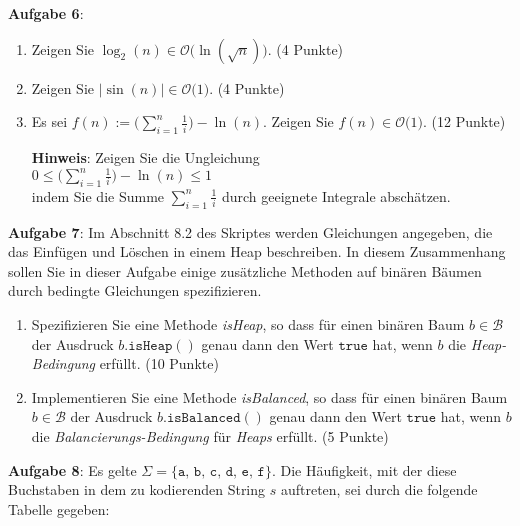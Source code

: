\documentclass{article}
\begin{document}
\noindent
\textbf{Aufgabe 6}:
\begin{enumerate}
\item Zeigen Sie $\log_2(n) \in \mathcal{O}\bigl(\ln(\sqrt{n})\bigr)$. \hspace*{\fill} (4  Punkte)
\item Zeigen Sie $\bigl|\sin(n)\bigr| \in \mathcal{O}\bigl(1\bigr)$. \hspace*{\fill} (4 Punkte)
\item Es sei 
      $f(n) := \biggl(\sum\limits_{i=1}^n \frac{1}{i}\biggr) - \ln(n)$.
      Zeigen Sie $f(n)\in \mathcal{O}\bigl(1\bigr)$. \hspace*{\fill} (12 Punkte)
      
      \textbf{Hinweis}: Zeigen Sie die Ungleichung
      \\[0.2cm]
      \hspace*{1.3cm}
      $0 \leq \biggl(\sum\limits_{i=1}^n \frac{1}{i}\biggr) - \ln(n) \leq 1$
      \\[0.2cm]
      indem Sie die Summe $\sum\limits_{i=1}^n \frac{1}{i}$ durch geeignete Integrale absch\"atzen.
\end{enumerate}
\vspace{0.3cm}


\noindent
\textbf{Aufgabe 7}:  Im Abschnitt 8.2 des Skriptes
werden Gleichungen angegeben, die das Einf\"ugen und L\"oschen in einem Heap beschreiben.
In diesem Zusammenhang sollen Sie in dieser Aufgabe  einige zus\"atzliche Methoden auf
bin\"aren B\"aumen durch bedingte Gleichungen spezifizieren.
\begin{enumerate}
\item Spezifizieren Sie eine Methode \textsl{isHeap}, so
      dass f\"ur einen bin\"aren Baum $b \in \mathcal{B}$ der Ausdruck 
      $b.\mathtt{isHeap}()$ genau dann den Wert $\mathtt{true}$ hat, wenn $b$ die
      \emph{Heap-Bedingung} erf\"ullt.  \hspace*{\fill} (10 Punkte)
\item Implementieren Sie eine Methode \textsl{isBalanced}, so
      dass f\"ur einen bin\"aren Baum $b \in \mathcal{B}$ der Ausdruck 
      $b.\mathtt{isBalanced}()$ genau dann den Wert $\mathtt{true}$ hat, wenn $b$ die
      \emph{Balancierungs-Bedingung} f\"ur \emph{Heaps} erf\"ullt.  
      \hspace*{\fill} (5 Punkte)
\end{enumerate}
\vspace{0.3cm}


\noindent
\textbf{Aufgabe 8}:
Es gelte $\Sigma = \{ \mathtt{a},\,\mathtt{b},\,\mathtt{c},\,\mathtt{d},\,\mathtt{e},\,\mathtt{f} \}$.
Die H\"aufigkeit, mit der diese Buchstaben in dem zu kodierenden String $s$ auftreten, sei durch die
folgende Tabelle gegeben:
\end{document}
